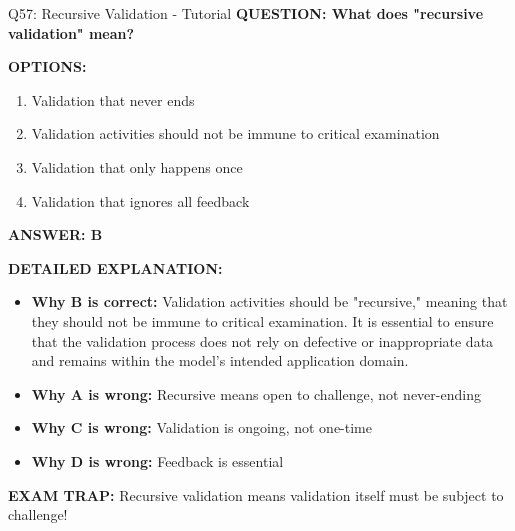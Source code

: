 \documentclass[8pt]{beamer}
\begin{document}
	\begin{frame}{Q57: Recursive Validation - Tutorial}
		\fontsize{6.5}{7.5}\selectfont
		\textbf{QUESTION: What does "recursive validation" mean?}
		
		\vspace{0.1cm}
		\textbf{OPTIONS:}
		\begin{enumerate}
			\item Validation that never ends
			\item Validation activities should not be immune to critical examination
			\item Validation that only happens once
			\item Validation that ignores all feedback
		\end{enumerate}
		
		\vspace{0.1cm}
		\textcolor{myblue}{\textbf{ANSWER: B}}
		
		\vspace{0.1cm}
		\textbf{DETAILED EXPLANATION:}
		\begin{itemize}
			\item \textbf{Why B is correct:} Validation activities should be "recursive," meaning that they should not be immune to critical examination. It is essential to ensure that the validation process does not rely on defective or inappropriate data and remains within the model's intended application domain.
			\item \textbf{Why A is wrong:} Recursive means open to challenge, not never-ending
			\item \textbf{Why C is wrong:} Validation is ongoing, not one-time
			\item \textbf{Why D is wrong:} Feedback is essential
		\end{itemize}
		
		\textcolor{myred}{\textbf{EXAM TRAP:}} Recursive validation means \textcolor{myblue}{validation itself must be subject to challenge}!
	\end{frame}
	
\end{document}
